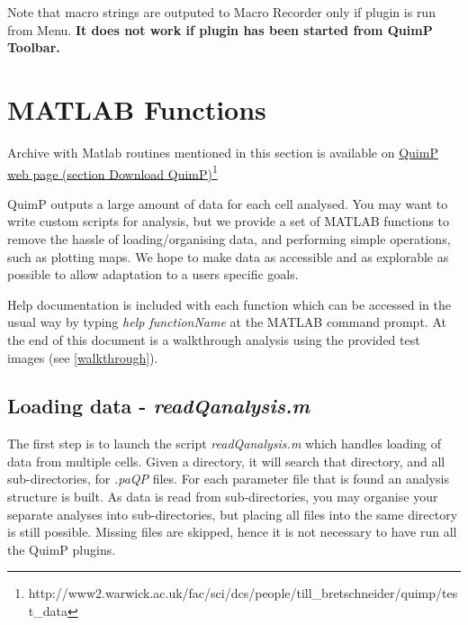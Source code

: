 \documentclass[a4paper,12pt]{article}
\begin{document}
Note that macro strings are outputed to Macro Recorder only if plugin is run from Menu. \textbf{It does not work if plugin has been started from QuimP Toolbar.}
 
\section{MATLAB Functions}
\label{matlab}

Archive with Matlab routines mentioned in this section is available on \href{http://www2.warwick.ac.uk/fac/sci/dcs/people/till_bretschneider/quimp/test_data}{QuimP web page (section Download QuimP)}\footnote{http://www2.warwick.ac.uk/fac/sci/dcs/people/till\_bretschneider/quimp/test\_data}

\noindent{}

QuimP outputs a large amount of data for each cell analysed.
You may want to write custom scripts for analysis, but we provide
a set of MATLAB functions to remove the hassle of loading/organising data, and performing
simple operations, such as plotting maps.
We hope to make data as accessible and as explorable as possible to allow adaptation to a users specific goals.

Help documentation is included with each function which can be accessed in the
usual way by typing \textit{help functionName} at
the MATLAB command prompt.  At the end of this document is a walkthrough analysis using the provided test images
(see \autoref{walkthrough}).

\subsection{Loading data - \textit{readQanalysis.m}  }

The first step is to launch the script \textit{readQanalysis.m} which handles loading of data from multiple
cells.  Given a directory, it will search that directory, and all sub-directories, for \textit{.paQP} files. For each parameter file
that is found an analysis structure is built.  As data is read from sub-directories, you may organise your separate analyses into 
sub-directories, but placing all files into the same directory is still possible. Missing files are skipped, hence it is not necessary to have run all the QuimP plugins.
\end{document}
